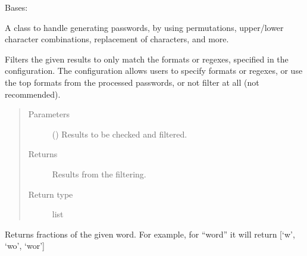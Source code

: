 \documentclass[letterpaper,10pt,english]{sphinxmanual}
\begin{document}
\begin{fulllineitems}
\label{\detokenize{EntroPass:EntroPass.pwd_gen.Pwd_gen}}
\sphinxAtStartPar
Bases: 

\sphinxAtStartPar
A class to handle generating passwords, by using permutations, upper/lower
character combinations, replacement of characters, and more.

\begin{fulllineitems}
\label{\detokenize{EntroPass:EntroPass.pwd_gen.Pwd_gen.filter}}
\sphinxAtStartPar
Filters the given results to only match the formats or regexes,
specified in the configuration.
The configuration allows users to specify formats or regexes, or use the top formats from
the processed passwords, or not filter at all (not recommended).
\begin{quote}\begin{description}
\item[{Parameters}] \leavevmode
\sphinxAtStartPar
{} () \textendash{} Results to be checked and filtered.

\item[{Returns}] \leavevmode
\sphinxAtStartPar
{} \textendash{} Results from the filtering.

\item[{Return type}] \leavevmode
\sphinxAtStartPar
list

\end{description}\end{quote}

\end{fulllineitems}


\begin{fulllineitems}
\label{\detokenize{EntroPass:EntroPass.pwd_gen.Pwd_gen.fraction}}
\sphinxAtStartPar
Returns fractions of the given word. For example,
for “word” it will return {[}‘w’, ‘wo’, ‘wor’{]}


\end{fulllineitems}
\end{fulllineitems}
\end{document}
